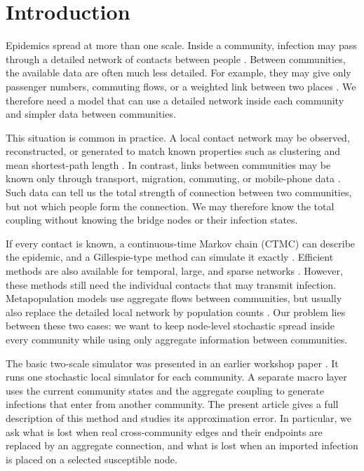 \begingroup\color{black}
\hypersetup{citecolor=black,linkcolor=black}

\section{Introduction}
\label{sec:introduction}

Epidemics spread at more than one scale. Inside a community, infection may pass through a detailed network of contacts between people \citep{keeling2005,pastorsatorras2015,kiss2017}. Between communities, the available data are often much less detailed. For example, they may give only passenger numbers, commuting flows, or a weighted link between two places \citep{balcan2009,barbosa2018human}. We therefore need a model that can use a detailed network inside each community and simpler data between communities.

This situation is common in practice. A local contact network may be observed, reconstructed, or generated to match known properties such as clustering and mean shortest-path length \citep{eubank2004,danon2011}. In contrast, links between communities may be known only through transport, migration, commuting, or mobile-phone data \citep{barbosa2018human,chang2021}. Such data can tell us the total strength of connection between two communities, but not which people form the connection. We may therefore know the total coupling without knowing the bridge nodes or their infection states.

If every contact is known, a continuous-time Markov chain (CTMC) can describe the epidemic, and a Gillespie-type method can simulate it exactly \citep{gillespie1977exact,gibson2000}. Efficient methods are also available for temporal, large, and sparse networks \citep{vestergaard2015,kuryliak2025simulating}. However, these methods still need the individual contacts that may transmit infection. Metapopulation models use aggregate flows between communities, but usually also replace the detailed local network by population counts \citep{colizza2007reaction,colizza2008,balcan2010modeling,ajelli2010}. Our problem lies between these two cases: we want to keep node-level stochastic spread inside every community while using only aggregate information between communities.

The basic two-scale simulator was presented in an earlier workshop paper \citep{kuryliak2025towards}. It runs one stochastic local simulator for each community. A separate macro layer uses the current community states and the aggregate coupling to generate infections that enter from another community. The present article gives a full description of this method and studies its approximation error. In particular, we ask what is lost when real cross-community edges and their endpoints are replaced by an aggregate connection, and what is lost when an imported infection is placed on a selected susceptible node.

